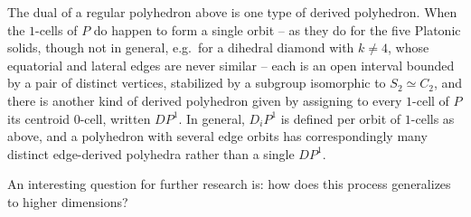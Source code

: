\documentclass{amsart}
\theoremstyle{plain}
\theoremstyle{definition}
\begin{document}
The dual of a regular polyhedron above is one type of derived polyhedron. When the $1$-cells of $P$ do happen to form a single orbit -- as they do for the five Platonic solids, though not in general, e.g.\ for a dihedral diamond with $k\neq 4$, whose equatorial and lateral edges are never similar -- each is an open interval bounded by a pair of distinct vertices, stabilized by a subgroup isomorphic to $S_2\simeq C_2$, and there is another kind of derived polyhedron given by assigning to every $1$-cell of $P$ its centroid $0$-cell, written $DP^1$. In general, $D_iP^1$ is defined per orbit of $1$-cells as above, and a polyhedron with several edge orbits has correspondingly many distinct edge-derived polyhedra rather than a single $DP^1$.
 
An interesting question for further research is: how does this process generalizes to higher dimensions?
\end{document}
